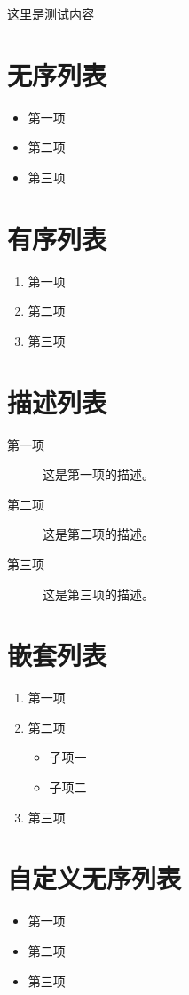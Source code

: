 这里是测试内容
\section*{无序列表}
\begin{itemize}
	\item 第一项
	\item 第二项
	\item 第三项
\end{itemize}

\section*{有序列表}
\begin{enumerate}
	\item 第一项
	\item 第二项
	\item 第三项
\end{enumerate}

\section*{描述列表}
\begin{description}
	\item[第一项] 这是第一项的描述。
	\item[第二项] 这是第二项的描述。
	\item[第三项] 这是第三项的描述。
\end{description}

\section*{嵌套列表}
\begin{enumerate}
	\item 第一项
	\item 第二项
	\begin{itemize}
		\item 子项一
		\item 子项二
	\end{itemize}
	\item 第三项
\end{enumerate}

\section*{自定义无序列表}
\begin{itemize}[label=\textbullet] %
	\item 第一项
	\item 第二项
	\item 第三项
\end{itemize}


